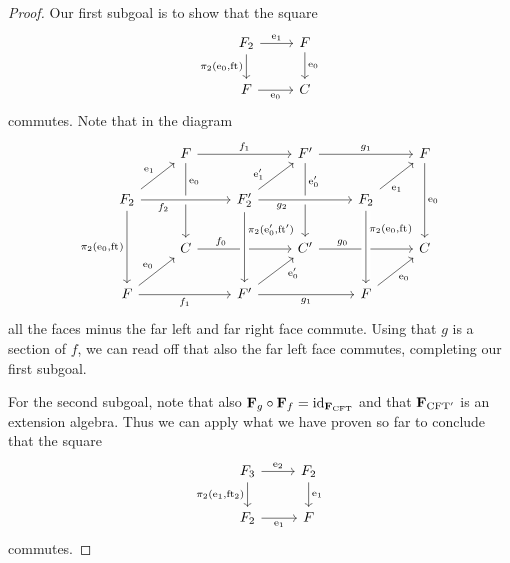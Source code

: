 \begin{proof}
Our first subgoal is to show that the square
\begin{equation*}
\begin{tikzcd}
\stesysf_2 
  \ar{r}{\efamext} 
  \ar{d}[swap]{\pullbackpr{2}{\ectxext}{\eft}} 
  & 
\stesysf 
  \ar{d}{\ectxext}
  \\
\stesysf
  \ar{r}[swap]{\ectxext} 
  & 
\stesysc
\end{tikzcd}
\end{equation*}
commutes. Note that in the diagram
\begin{equation*}
\begin{tikzcd}
  {}
  & 
\stesysf
  \ar{dd}[near start]{\ectxext}
  \ar{rr}{f_1}
  &
  &
\stesysf'
  \ar{dd}[near start]{\ectxext'}
  \ar{rr}{g_1}
  &
  &
\stesysf
  \ar{dd}{\ectxext}
  \\
\stesysf_2
  \ar{dd}[swap]{\pullbackpr{2}{\ectxext}{\eft}}
  \ar[crossing over]{rr}[swap,near start]{f_2}
  \ar{ur}{\efamext}
  &
  &
\stesysf_2'
  \ar{ur}[near start]{\efamext'}
  \ar[crossing over]{rr}[swap,near start]{g_2}
  &
  &
\stesysf_2
  \ar{ur}[swap,near start]{\efamext}
  \\
  {}
  &
\stesysc
  \ar{rr}[near start]{f_0}
  &
  &
\stesysc'
  \ar{rr}[near start]{g_0}
  &
  &
\stesysc
  \\
\stesysf 
  \ar{rr}[swap]{f_1}
  \ar{ur}{\ectxext}
  &
  &
\stesysf' 
  \ar[crossing over,leftarrow]{uu}[near end,swap]{\pullbackpr{2}{\ectxext'}{\eft'}}
  \ar{ur}[swap,near end]{\ectxext'}
  \ar{rr}[swap]{g_1}
  &
  &
\stesysf
  \ar[crossing over,leftarrow]{uu}[near end,swap]{\pullbackpr{2}{\ectxext}{\eft}}
  \ar{ur}[swap]{\ectxext}
\end{tikzcd}
\end{equation*}
all the faces minus the far left and far right face commute. Using that $g$
is a section of $f$, we can read off that also the far left face commutes,
completing our first subgoal.
 
For the second subgoal, note that also $\mathbf{F}_{g}\circ\mathbf{F}_{f}=
{\mathrm{id}_{\mathbf{F}_{\mathrm{CFT}}}}$ and that $\mathbf{F}_{\mathrm{CFT}'}$ is an extension algebra.
Thus we can apply what we have proven so far to conclude that the square
\begin{equation*}
\begin{tikzcd}
\stesysf_3 
  \ar{r}{\eext{2}} 
  \ar{d}[swap]{\pullbackpr{2}{\efamext}{\eft[2]}} 
  & 
\stesysf_2 
  \ar{d}{\efamext}
  \\
\stesysf_2
  \ar{r}[swap]{\efamext} 
  & 
\stesysf
\end{tikzcd}
\end{equation*}
commutes.
\end{proof}

